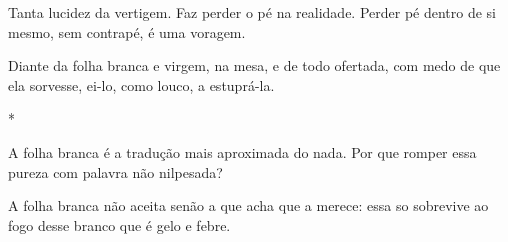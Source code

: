\begin{poem}
\begin{stanza}
Tanta lucidez da vertigem.\verseline
Faz perder o pé na realidade.\verseline
Perder pé dentro de si mesmo,\verseline
sem contrapé, é uma voragem.
\end{stanza}
\begin{stanza}
Diante da folha branca e virgem,\verseline
na mesa, e de todo ofertada,\verseline
com medo de que ela sorvesse,\verseline
ei-lo, como louco, a estuprá-la.
\end{stanza}
\begin{stanza}
\hspace{2cm}*
\end{stanza}
\begin{stanza}
A folha branca é a tradução\verseline
mais aproximada do nada.\verseline
Por que romper essa pureza\verseline
com palavra não nilpesada?
\end{stanza}
\begin{stanza}
A folha branca não aceita\verseline
senão a que acha que a merece:\verseline
essa so sobrevive ao fogo\verseline
desse branco que é gelo e febre.
\end{stanza}
\end{poem}